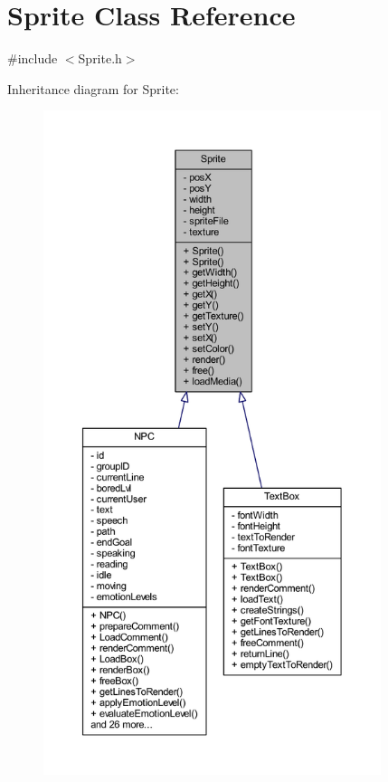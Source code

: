 \hypertarget{class_sprite}{}\section{Sprite Class Reference}
\label{class_sprite}


{\ttfamily \#include $<$Sprite.\+h$>$}



Inheritance diagram for Sprite\+:\nopagebreak
\begin{figure}[H]
\begin{center}
\leavevmode
\includegraphics[height=550pt]{class_sprite__inherit__graph}
\end{center}
\end{figure}


